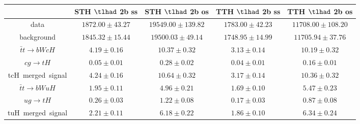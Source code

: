 \begin{tabular}{|c|c|c|c|c|} \hline
 & STH $\tlhad$ 2b ss & STH $\tlhad$ 2b os & TTH $\tlhad$ 2b ss & TTH $\tlhad$ 2b os\\\hline
data & $1872.00\pm43.27$ & $19549.00\pm139.82$ & $1783.00\pm42.23$ & $11708.00\pm108.20$\\\hline
background & $1845.32\pm15.44$ & $19500.03\pm49.14$ & $1748.95\pm14.99$ & $11705.94\pm37.76$\\\hline
$\bar{t}t\to bWcH$ & $4.19\pm0.16$ & $10.37\pm0.32$ & $3.13\pm0.14$ & $10.19\pm0.32$\\\hline
$cg\to tH$ & $0.05\pm0.01$ & $0.28\pm0.02$ & $0.04\pm0.01$ & $0.16\pm0.01$\\\hline
tcH~merged~signal & $4.24\pm0.16$ & $10.64\pm0.32$ & $3.17\pm0.14$ & $10.36\pm0.32$\\\hline
$\bar{t}t\to bWuH$ & $1.95\pm0.11$ & $4.96\pm0.21$ & $1.69\pm0.10$ & $5.47\pm0.23$\\\hline
$ug\to tH$ & $0.26\pm0.03$ & $1.22\pm0.08$ & $0.17\pm0.03$ & $0.87\pm0.08$\\\hline
tuH~merged~signal & $2.21\pm0.11$ & $6.18\pm0.22$ & $1.86\pm0.10$ & $6.34\pm0.24$\\\hline
\end{tabular}
